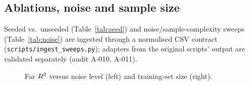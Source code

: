 \subsection{Ablations, noise and sample size}
Seeded vs.\ unseeded (Table~\ref{tab:seed}) and noise/sample-complexity sweeps (Table~\ref{tab:noise}) are ingested through a normalised CSV contract (\texttt{scripts/ingest\_sweeps.py}); adapters from the original scripts' output are validated separately (audit A-010, A-011).
\begin{table}[t]\centering\small{}\caption{Seeded vs.\ unseeded.}\label{tab:seed}\end{table}
\begin{table}[t]\centering\small{}\caption{Noise and sample-size sensitivity.}\label{tab:noise}\end{table}
\begin{figure}[t]\centering{}\caption{Far $R^2$ versus noise level (left) and training-set size (right).}\label{fig:sweeps}\end{figure}
\begin{table}[t]\centering\scriptsize{}\caption{Compute and API cost per variant (DeFi).}\label{tab:cost}\end{table}
